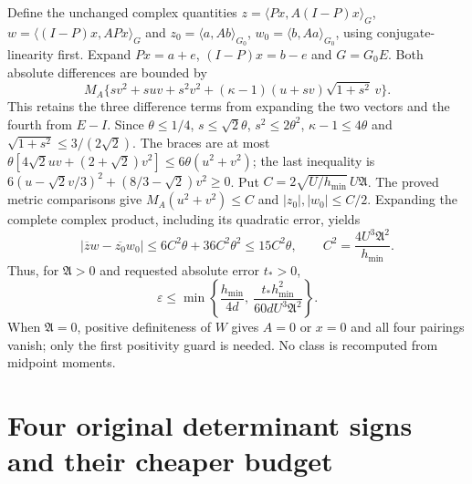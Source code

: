 \documentclass[11pt]{article}
\begin{document}
Define the unchanged complex quantities
$z=\langle Px,A(I-P)x\rangle_G$,
$w=\langle(I-P)x,APx\rangle_G$ and
$z_0=\langle a,Ab\rangle_{G_0}$,
$w_0=\langle b,Aa\rangle_{G_0}$, using conjugate-linearity first.
Expand $Px=a+e$, $(I-P)x=b-e$ and $G=G_0E$.
Both absolute differences are bounded by
\[
 M_A\{sv^2+suv+s^2v^2+
           (\kappa-1)(u+sv)\sqrt{1+s^2}\,v\}.
\]
This retains the three difference terms from expanding the two
vectors and the fourth from $E-I$. Since $\theta\le1/4$,
$s\le\sqrt2\theta$, $s^2\le2\theta^2$,
$\kappa-1\le4\theta$ and
$\sqrt{1+s^2}\le3/(2\sqrt2)$.
The braces are at most
$\theta[4\sqrt2uv+(2+\sqrt2)v^2]\le6\theta(u^2+v^2)$;
the last inequality is
$6(u-\sqrt2v/3)^2+(8/3-\sqrt2)v^2\ge0$.
Put $C=2\sqrt{U/h_{\min}}\,U\mathfrak A$.
The proved metric comparisons give
$M_A(u^2+v^2)\le C$ and
$|z_0|,|w_0|\le C/2$. Expanding the complete complex product,
including its quadratic error, yields
\begin{equation}\tag{MI20}\label{mi:current}
 |\overline zw-\overline{z_0}w_0|
 \le 6C^2\theta+36C^2\theta^2\le15C^2\theta,\qquad
 C^2=\frac{4U^3\mathfrak A^2}{h_{\min}}.
\end{equation}
Thus, for $\mathfrak A>0$ and requested absolute error $t_*>0$,
\begin{equation}\tag{MI21}\label{mi:epscurrent}
 \varepsilon\le
 \min\left\{\frac{h_{\min}}{4d},\
       \frac{t_*h_{\min}^2}{60dU^3\mathfrak A^2}\right\}.
\end{equation}
When $\mathfrak A=0$, positive definiteness of $W$ gives $A=0$
or $x=0$ and all four pairings vanish; only the first positivity
guard is needed. No class is recomputed from midpoint moments.

\section{Four original determinant signs and their cheaper budget}
\end{document}
